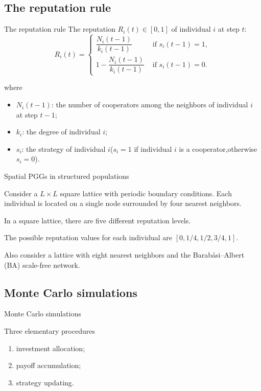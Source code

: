\documentclass[notheorems,11pt,compress]{beamer}
\numberwithin{figure}{section}
\numberwithin{table}{section}
\numberwithin{equation}{section}
\theoremstyle{plain}
\numberwithin{theorem}{section}
\numberwithin{definition}{section}
\numberwithin{lemma}{section}
\numberwithin{proposition}{section}
\numberwithin{corollary}{section}
\theoremstyle{example}
\begin{document}
\subsection{The reputation rule}
\begin{frame}{The reputation rule}
	The reputation $R_i(t)\in[0,1]$ of individual $i$ at step $t$:
	\begin{equation}
		R_i(t)= \begin{cases}\dfrac{N_i(t-1)}{k_i(t-1)} & \text { if } s_i(t-1)=1, \\ 1-\dfrac{N_i(t-1)}{k_i(t-1)} & \text { if } s_i(t-1)=0.\end{cases}
	\end{equation}

	where
	\begin{itemize}
		\item $N_i(t-1)$: the number of cooperators among the neighbors of individual $i$ at step $t-1$;
		\item $k_i$: the degree of individual $i$;
		\item $s_i$: the strategy of individual $i$($s_i=1$ if individual $i$ is a cooperator,otherwise $s_i=0$).
	\end{itemize}

\end{frame}


\begin{frame}{Spatial PGGs in structured populations}

	Consider a $L\times L$ square lattice with periodic boundary conditions.
	Each individual is located on a single node surrounded by four nearest neighbors.

	In a square lattice, there are five different reputation levels.

	The possible reputation values for each individual are $\left[0,1/4,1/2,3/4,1\right]$.

	Also consider a lattice with eight nearest neighbors and the Barabási–Albert (BA) scale-free network.

\end{frame}

\subsection{Monte Carlo simulations}

\begin{frame}{Monte Carlo simulations}
	\begin{exampleblock}{Three elementary procedures}
		\begin{enumerate}
			\item investment allocation;
			\item payoff accumulation;
			\item strategy updating.
		\end{enumerate}
	\end{exampleblock}
\end{frame}
\end{document}
